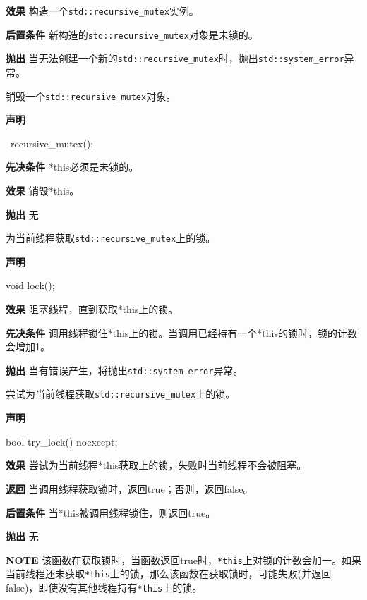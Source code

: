 \textbf{效果}
构造一个\texttt{std::recursive\_mutex}实例。

\textbf{后置条件}
新构造的\texttt{std::recursive\_mutex}对象是未锁的。

\textbf{抛出}
当无法创建一个新的\texttt{std::recursive\_mutex}时，抛出\texttt{std::system\_error}异常。


销毁一个\texttt{std::recursive\_mutex}对象。

\textbf{声明}

\begin{cpp}
~recursive_mutex();
\end{cpp}

\textbf{先决条件}
*this必须是未锁的。

\textbf{效果}
销毁*this。

\textbf{抛出}
无


为当前线程获取\texttt{std::recursive\_mutex}上的锁。

\textbf{声明}

\begin{cpp}
void lock();
\end{cpp}

\textbf{效果}
阻塞线程，直到获取*this上的锁。

\textbf{先决条件}
调用线程锁住*this上的锁。当调用已经持有一个*this的锁时，锁的计数会增加1。

\textbf{抛出}
当有错误产生，将抛出\texttt{std::system\_error}异常。


尝试为当前线程获取\texttt{std::recursive\_mutex}上的锁。

\textbf{声明}

\begin{cpp}
bool try_lock() noexcept;
\end{cpp}

\textbf{效果}
尝试为当前线程*this获取上的锁，失败时当前线程不会被阻塞。

\textbf{返回}
当调用线程获取锁时，返回true；否则，返回false。

\textbf{后置条件}
当*this被调用线程锁住，则返回true。

\textbf{抛出}
无

\textbf{NOTE} 该函数在获取锁时，当函数返回true时，\texttt{*this}上对锁的计数会加一。如果当前线程还未获取\texttt{*this}上的锁，那么该函数在获取锁时，可能失败(并返回false)，即使没有其他线程持有\texttt{*this}上的锁。

